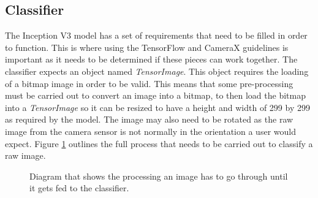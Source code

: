 \documentclass[12pt,a4paper]{report}
\begin{document}
\par

\subsection{Classifier}

The Inception V3 model has a set of requirements that need to be filled in order to function. This is where using the 
TensorFlow and CameraX guidelines is important as it needs to be determined if these pieces can work together. 
The classifier expects 
an object named \emph{TensorImage}. This object requires the loading of a bitmap image in order to be valid. This means that
some pre-processing must be carried out to convert an image into a bitmap, to then load the bitmap into a \emph{TensorImage} so it can 
 be resized to have a height and width of 299 by 299 as required by the model.  The image may also need to be rotated
as the raw image from the camera sensor is not normally in the orientation a user would expect.
Figure \ref{fig:classify} outlines the full process that needs to be carried out to classify a raw image.

\begin{figure}[h]
    \centering

    \caption{Diagram that shows the processing an image has to go through until it gets fed to the classifier.}
    \label{fig:classify}
\end{figure}
\end{document}
